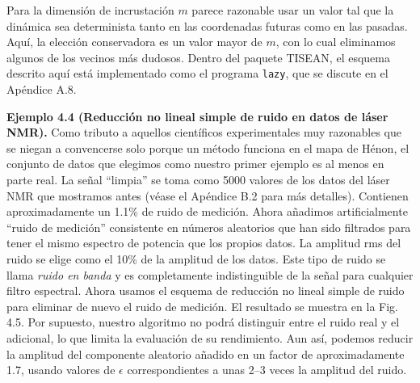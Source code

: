 \documentclass[10pt,a4paper]{book}
\begin{document}
\bigskip

Para la dimensión de incrustación $m$ parece razonable usar un valor tal que la dinámica sea determinista tanto en las coordenadas futuras como en las pasadas. Aquí, la elección conservadora es un valor mayor de $m$, con lo cual eliminamos algunos de los vecinos más dudosos. Dentro del paquete TISEAN, el esquema descrito aquí está implementado como el programa \texttt{lazy}, que se discute en el Apéndice A.8.

\newpage

\textbf{Ejemplo 4.4 (Reducción no lineal simple de ruido en datos de láser NMR).} Como tributo a aquellos científicos experimentales muy razonables que se niegan a convencerse solo porque un método funciona en el mapa de Hénon, el conjunto de datos que elegimos como nuestro primer ejemplo es al menos en parte real. La señal “limpia” se toma como 5000 valores de los datos del láser NMR que mostramos antes (véase el Apéndice B.2 para más detalles). Contienen aproximadamente un 1.1\% de ruido de medición. Ahora añadimos artificialmente “ruido de medición” consistente en números aleatorios que han sido filtrados para tener el mismo espectro de potencia que los propios datos. La amplitud rms del ruido se elige como el 10\% de la amplitud de los datos. Este tipo de ruido se llama \textit{ruido en banda} y es completamente indistinguible de la señal para cualquier filtro espectral. Ahora usamos el esquema de reducción no lineal simple de ruido para eliminar de nuevo el ruido de medición. El resultado se muestra en la Fig. 4.5. Por supuesto, nuestro algoritmo no podrá distinguir entre el ruido real y el adicional, lo que limita la evaluación de su rendimiento. Aun así, podemos reducir la amplitud del componente aleatorio añadido en un factor de aproximadamente 1.7, usando valores de $\epsilon$ correspondientes a unas 2–3 veces la amplitud del ruido.

\bigskip
\end{document}
